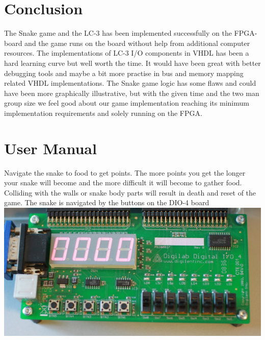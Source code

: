 \documentclass{acm_proc_article-sp}
\begin{document}
\section{Conclusion}
The Snake game and the LC-3 has been implemented successfully on the FPGA-board and the game runs on the board without help from additional computer resources. 
The implementations of LC-3 I/O components in VHDL has been a hard learning curve but well worth the time.
It would have been great with better debugging tools and maybe a bit more practise in bus and memory mapping related VHDL implementations.
The Snake game logic has some flaws and could have been more graphically illustrative, but with the given time and the two man group size we feel good about our game implementation reaching its minimum implementation requirements and solely running on the FPGA. 




\appendix


%
%

\section{User Manual}
Navigate the snake to food to get points. The more points you get the longer your snake will become and the more difficult it will become to gather food.
Colliding with the walls or snake body parts will result in death and reset of the game. The snake is navigated by the buttons on the DIO-4 board 
\includegraphics[scale=0.064]{img/DIO4Buttons.jpg} 
\end{document}
